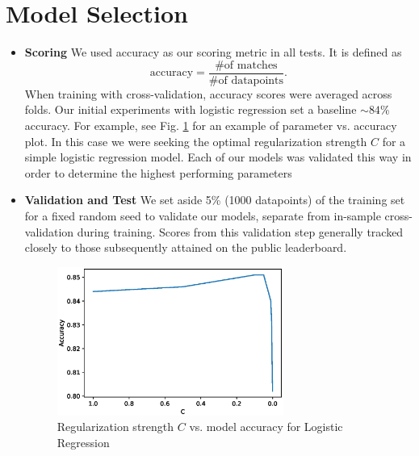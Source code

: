 \section{Model Selection}
\medskip
\begin{itemize}
  
\item \textbf{Scoring} 
  We used accuracy as our scoring metric in all tests. It is defined as
  $$
  \text{accuracy}=\frac{\text{\# of matches}}{\text{\# of datapoints}}.
  $$
  When training with cross-validation, accuracy scores were averaged across folds. Our initial experiments with logistic regression set a baseline $\sim 84$\% accuracy. For example, see Fig. \ref{acc} for an example of parameter vs. accuracy plot. In this case we were seeking the optimal regularization strength $C$ for a simple logistic regression model. Each of our models was validated this way in order to determine the highest performing parameters
    
\item \textbf{Validation and Test} 
  We set aside 5\% (1000 datapoints) of the training set for a fixed random seed to validate our models, separate from in-sample cross-validation during training. Scores from this validation step generally tracked closely to those subsequently attained on the public leaderboard.
    \begin{figure}[h]
  	\centering
  	\includegraphics[width=0.7\textwidth]{acc.eps}
  	\caption{Regularization strength $C$ vs. model accuracy for Logistic Regression}\label{acc}
  \end{figure}
\end{itemize}



